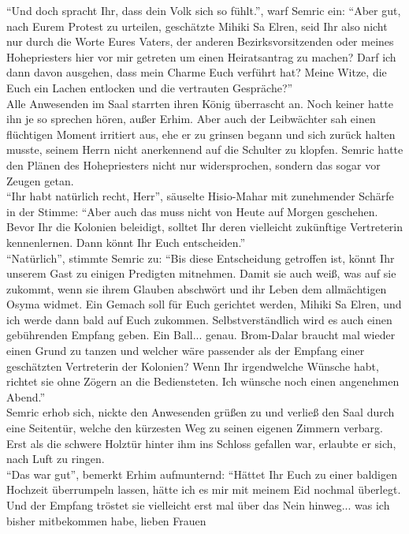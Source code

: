 ``Und doch spracht Ihr, dass dein Volk sich so fühlt.'', warf Semric ein: ``Aber gut, nach Eurem 
Protest zu urteilen, geschätzte Mihiki Sa Elren, seid Ihr also nicht nur durch die Worte Eures 
Vaters, der anderen Bezirksvorsitzenden oder meines Hohepriesters hier vor mir getreten um einen 
Heiratsantrag zu machen? Darf ich dann davon ausgehen, dass mein Charme Euch verführt hat? Meine 
Witze, die Euch ein Lachen entlocken und die vertrauten Gespräche?''\\
Alle Anwesenden im Saal starrten ihren König überrascht an. Noch keiner hatte ihn je so sprechen 
hören, außer Erhim. Aber auch der Leibwächter sah einen flüchtigen Moment irritiert aus, ehe er zu 
grinsen begann und sich zurück halten musste, seinem Herrn nicht anerkennend auf die Schulter zu 
klopfen. Semric hatte den Plänen des Hohepriesters nicht nur widersprochen, sondern das sogar vor 
Zeugen getan.\\
``Ihr habt natürlich recht, Herr'', säuselte Hisio-Mahar mit zunehmender Schärfe in der Stimme: 
``Aber auch das muss nicht von Heute auf Morgen geschehen. Bevor Ihr die Kolonien beleidigt, 
solltet Ihr deren vielleicht zukünftige Vertreterin kennenlernen. Dann könnt Ihr Euch 
entscheiden.''\\
``Natürlich'', stimmte Semric zu: ``Bis diese Entscheidung getroffen ist, könnt Ihr unserem Gast zu 
einigen Predigten mitnehmen. Damit sie auch weiß, was auf sie zukommt, wenn sie ihrem Glauben 
abschwört und ihr Leben dem allmächtigen Osyma widmet. Ein Gemach soll für Euch gerichtet werden, 
Mihiki Sa Elren, und ich werde dann bald auf Euch zukommen. Selbstverständlich wird es auch einen 
gebührenden Empfang geben. Ein Ball... genau. Brom-Dalar braucht mal wieder einen Grund zu tanzen 
und welcher wäre passender als der Empfang einer geschätzten Vertreterin der Kolonien? Wenn Ihr 
irgendwelche Wünsche habt, richtet sie ohne Zögern an die Bediensteten. Ich wünsche noch einen 
angenehmen Abend.''\\
Semric erhob sich, nickte den Anwesenden grüßen zu und verließ den Saal durch eine Seitentür, 
welche den kürzesten Weg zu seinen eigenen Zimmern verbarg. Erst als die schwere Holztür hinter ihm 
ins Schloss gefallen war, erlaubte er sich, nach Luft zu ringen.\\
``Das war gut'', bemerkt Erhim aufmunternd: ``Hättet Ihr Euch zu einer baldigen Hochzeit 
überrumpeln lassen, hätte ich es mir mit meinem Eid nochmal überlegt. Und der Empfang tröstet 
sie vielleicht erst mal über das Nein hinweg... was ich bisher mitbekommen habe, lieben Frauen 
